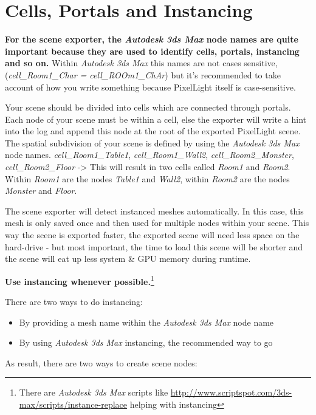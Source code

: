 \chapter{Cells, Portals and Instancing}
\textbf{For the scene exporter, the \emph{Autodesk 3ds Max} node names are quite important because they are used to identify cells, portals, instancing and so on.} Within \emph{Autodesk 3ds Max} this names are not cases sensitive, (\emph{cell\_Room1\_Char = cell\_ROOm1\_ChAr}) but it's recommended to take account of how you write something because PixelLight itself is case-sensitive.

Your scene should be divided into cells which are connected through portals. Each node of your scene must be within a cell, else the exporter will write a hint into the log and append this node at the root of the exported PixelLight scene. The spatial subdivision of your scene is defined by using the \emph{Autodesk 3ds Max} node names. \emph{cell\_Room1\_Table1}, \emph{cell\_Room1\_Wall2}, \emph{cell\_Room2\_Monster}, \emph{cell\_Room2\_Floor} -> This will result in two cells called \emph{Room1} and \emph{Room2}. Within \emph{Room1} are the nodes \emph{Table1} and \emph{Wall2}, within \emph{Room2} are the nodes \emph{Monster} and \emph{Floor}.

The scene exporter will detect instanced meshes automatically. In this case, this mesh is only saved once and then used for multiple nodes within your scene. This way the scene is exported faster, the exported scene will need less space on the hard-drive - but most important, the time to load this scene will be shorter and the scene will eat up less system \& GPU memory during runtime.

\textbf{Use instancing whenever possible.}\footnote{There are \emph{Autodesk 3ds Max} scripts like \url{http://www.scriptspot.com/3ds-max/scripts/instance-replace} helping with instancing}

There are two ways to do instancing:

\begin{itemize}
\item{By providing a mesh name within the \emph{Autodesk 3ds Max} node name}
\item{By using \emph{Autodesk 3ds Max} instancing, the recommended way to go}
\end{itemize}

As result, there are two ways to create scene nodes:

